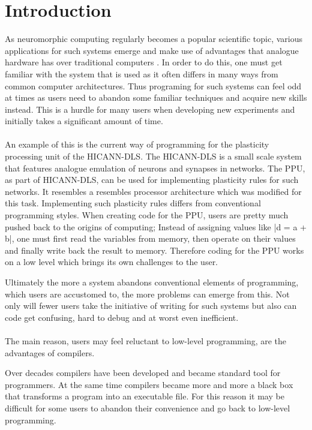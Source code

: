 \chapter{Introduction}
\label{chapter:introduction}

As neuromorphic computing regularly becomes a popular scientific topic, various  applications for such systems emerge and make use of advantages that analogue hardware has over traditional computers .
In order to do this, one must get familiar with the system that is used as it often differs in many ways from common computer architectures.
Thus programing for such systems can feel odd at times as users need to abandon some familiar techniques and acquire new skills instead.
This is a hurdle for many users when developing new experiments and initially takes a significant amount of time. 
\\
\\
An example of this is the current way of programming for the plasticity processing unit of the HICANN-DLS. 
The HICANN-DLS is a small scale system that features analogue emulation of neurons and synapses in networks.
The PPU, as part of HICANN-DLS, can be used for implementing plasticity rules for such networks.
It resembles a resembles processor architecture which was modified for this task.
Implementing such plasticity rules differs from conventional programming styles. 
When creating code for the PPU, users are pretty much pushed back to the origins of computing;
Instead of assigning values like |d = a + b|, one must first read the variables from memory, then operate on their values and finally write back the result to memory.
Therefore coding for the PPU works on a low level which brings its own challenges to the user.

Ultimately the more a system abandons conventional elements of programming, which users are accustomed to, the more problems can emerge from this.
Not only will fewer users take the initiative of writing for such systems but also can code get confusing, hard to debug and at worst even inefficient.
\\
\\
The main reason, users may feel reluctant to low-level programming, are the advantages of compilers.

Over decades compilers have been developed and became standard tool for programmers.
At the same time compilers became more and more a black box that transforms a program into an executable file.
For this reason it may be difficult for some users to abandon their convenience and go back to low-level programming.

